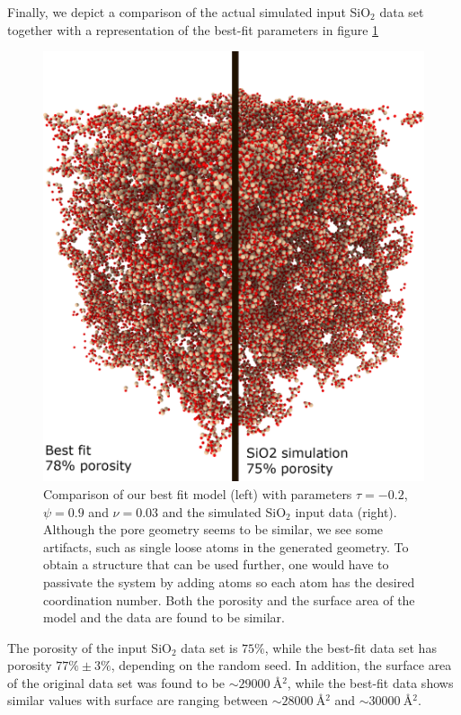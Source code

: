 \documentclass[aps,pre,twocolumn,letterpaper,floatfix,showpacs]{revtex4}
\begin{document}
Finally, we depict a comparison of the actual simulated input SiO$_2$ data set together with a
representation of the best-fit parameters in figure \ref{fig:porous_vs_model}   
\begin{figure}
\includegraphics[width=.45\textwidth]{fig9.png}
\caption{Comparison of our best fit model (left) with parameters $\tau=-0.2$, $\psi=0.9$ and $\nu=0.03$ and the simulated SiO$_2$ input data (right).
Although the pore geometry seems to be similar, we see some artifacts, such as single loose atoms in the generated geometry.
To obtain a structure that can be used further, one would have to passivate the system by adding atoms so each atom has the desired coordination number.
Both the porosity and the surface area of the model and the data are found to be similar.}
\label{fig:porous_vs_model}
\end{figure}

The porosity of the input SiO$_2$ data set is $75\%$, while the best-fit data set has
porosity $77\% \pm 3 \%$, depending on the random seed. In addition, the surface area
of the original data set was found to be $\sim \SI{29000}{\angstrom^2}$, while the best-fit data
shows similar values with surface are ranging between $\sim \SI{28000}{\angstrom^2}$ and $\sim \SI{30000}{\angstrom^2}$.
\end{document}
